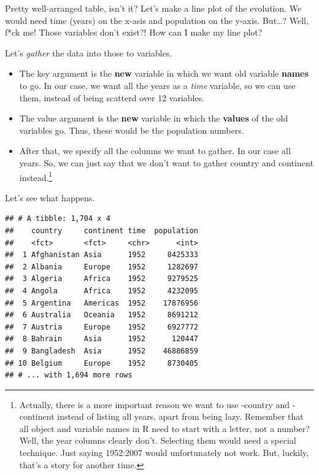 \documentclass[]{tufte-book}
\newenvironment{Shaded}{}{}
\newcommand{\DataTypeTok}[1]{\textcolor[rgb]{0.56,0.13,0.00}{#1}}
\newcommand{\KeywordTok}[1]{\textcolor[rgb]{0.00,0.44,0.13}{\textbf{#1}}}
\newcommand{\NormalTok}[1]{#1}
\newcommand{\OperatorTok}[1]{\textcolor[rgb]{0.40,0.40,0.40}{#1}}
\newcommand{\StringTok}[1]{\textcolor[rgb]{0.25,0.44,0.63}{#1}}
\providecommand{\tightlist}{%
  \setlength{\itemsep}{0pt}\setlength{\parskip}{0pt}}
\begin{document}
Pretty well-arranged table, isn't it? Let's make a line plot of the evolution. We would need time (years) on the x-asis and population on the y-axis. But\ldots? Well, f*ck me! Those variables don't exist?! How can I make my line plot?

Let's \emph{gather} the data into those to variables.

\begin{itemize}
\tightlist
\item
  The key argument is the \textbf{new} variable in which we want old variable \textbf{names} to go. In our case, we want all the years as a \emph{time} variable, so we can use them, instead of being scatterd over 12 variables.
\item
  The value argument is the \textbf{new} variable in which the \textbf{values} of the old variables go. Thus, these would be the population numbers.
\item
  After that, we specify all the columns we want to gather. In our case all years. So, we can just say that we don't want to gather country and continent instead.\footnote{Actually, there is a more important reason we want to use -country and -continent instead of listing all years, apart from being lazy. Remember that all object and variable names in R need to start with a letter, not a number? Well, the year columns clearly don't. Selecting them would need a special technique. Just saying 1952:2007 would unfortunately not work. But, luckily, that's a story for another time.}
\end{itemize}

Let's see what happens.

\begin{Shaded}
\end{Shaded}

\begin{verbatim}
## # A tibble: 1,704 x 4
##    country     continent time  population
##    <fct>       <fct>     <chr>      <int>
##  1 Afghanistan Asia      1952     8425333
##  2 Albania     Europe    1952     1282697
##  3 Algeria     Africa    1952     9279525
##  4 Angola      Africa    1952     4232095
##  5 Argentina   Americas  1952    17876956
##  6 Australia   Oceania   1952     8691212
##  7 Austria     Europe    1952     6927772
##  8 Bahrain     Asia      1952      120447
##  9 Bangladesh  Asia      1952    46886859
## 10 Belgium     Europe    1952     8730405
## # ... with 1,694 more rows
\end{verbatim}
\end{document}
